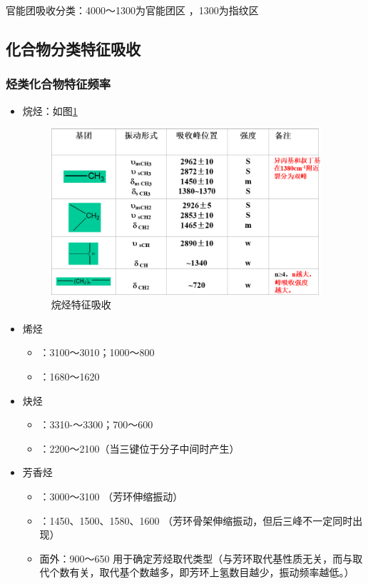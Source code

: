 \begin{note}                  
	官能团吸收分类：4000～1300为官能团区 ，1300为指纹区
\end{note}
\subsection{化合物分类特征吸收}
\subsubsection*{ 烃类化合物特征频率}
\begin{itemize}
	\item 烷烃：如图\ref{fig:chp5_ch}
	\begin{figure}[ht]
		\centering
		\includegraphics[width=10cm]{image/chp5_ch.png}
		\caption{烷烃特征吸收}
		\label{fig:chp5_ch}
	\end{figure}
	\item 烯烃
	\begin{itemize}                    
		\item {}：3100～3010；1000～800
		\item {}：1680～1620
	\end{itemize}
	\item 炔烃
	\begin{itemize}                  
		\item {}：3310-～3300；700～600
		\item {}：2200～2100（当三键位于分子中间时产生）
	\end{itemize}
	\item 芳香烃
	\begin{itemize}         
		\item {}：3000～3100 （芳环伸缩振动）
		\item {}：1450、1500、1580、1600 （芳环骨架伸缩振动，但后三峰不一定同时出现）
		\item 面外：900～650  用于确定芳烃取代类型（与芳环取代基性质无关，而与取代个数有关，取代基个数越多，即芳环上氢数目越少，振动频率越低。）

\end{itemize}
\end{itemize}
